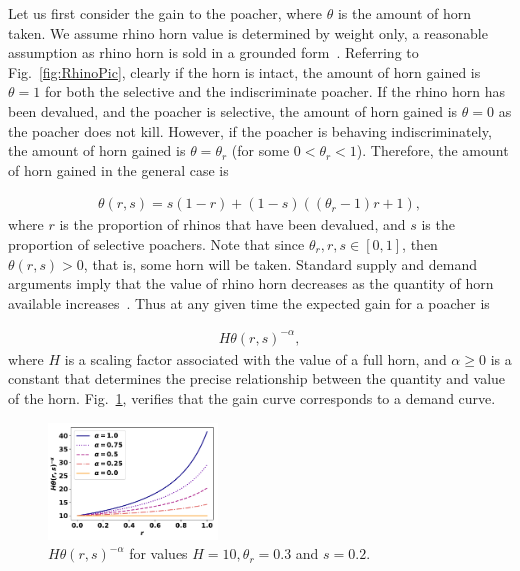 \documentclass[10pt]{article}
\begin{document}
Let us first consider the gain to the poacher, where \(\theta\) is the amount of 
horn taken. We assume rhino horn value is determined by weight only, a 
reasonable assumption as rhino horn is sold in a grounded form~\cite{Saverhino}.
Referring to Fig.~\ref{fig:RhinoPic}, clearly if the horn is intact, the amount of
horn gained is \(\theta=1\) for both the selective and the indiscriminate poacher.
If the rhino horn has been devalued, and the poacher is selective, the amount of horn 
gained is \(\theta=0\) as the poacher does not kill. However, if the poacher is 
behaving indiscriminately, the amount of horn gained is \(\theta = \theta_r\)
(for some \(0<\theta_r<1\)). 
Therefore, the amount of horn gained in the general case is

\begin{eqnarray}
    \label{eqn:theta}
    \theta(r, s) = s (1 - r) + (1 - s) ((\theta_r - 1) r + 1),
\end{eqnarray}
where \(r\) is the proportion of rhinos that have been devalued, and \(s\) is the 
proportion of selective poachers. Note that since \(\theta_r, r, s  \in [0, 1]\), then
\(\theta(r, s) > 0\), that is, some horn will be taken. Standard supply and demand arguments imply that the value
of rhino horn decreases as the quantity of horn available increases~\cite{mankiw2010}.
Thus at any given time the expected gain for a poacher is

\begin{eqnarray}
    \label{eqn:individual_gain}
    H \theta(r,s)^{-\alpha},
\end{eqnarray}
where \(H\) is a scaling factor associated with the value of a full horn, and 
\(\alpha \geq 0\) is a constant that determines the precise relationship between
the quantity and value of the horn.  Fig.~\ref{fig:GainCurve}, verifies that the 
gain curve corresponds to a demand curve.

\begin{figure}[!htbp]
\centering
\includegraphics[width=0.4\textwidth]{images/gain_curve.pdf}
\caption{\label{fig:GainCurve} \(H \theta(r, s) ^{- \alpha}\) for values 
\(H = 10, \theta_r = 0.3\) and \(s = 0.2.\)}
\end{figure}
\end{document}
